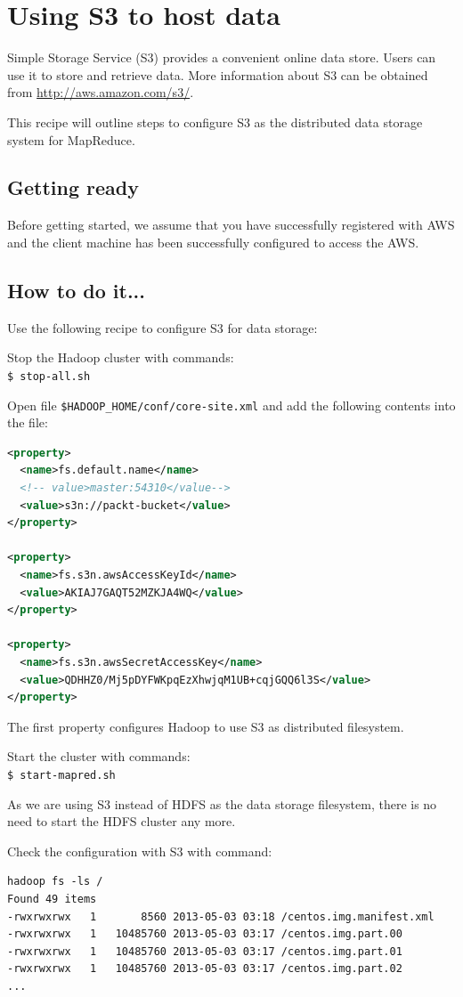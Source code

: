 \section{Using S3 to host data}
Simple Storage Service (S3) provides a convenient online data store. Users can use it to store and retrieve data. More information about S3 can be obtained from \url{http://aws.amazon.com/s3/}.

This recipe will outline steps to configure S3 as the distributed data storage system for MapReduce.

\subsection*{Getting ready}
Before getting started, we assume that you have successfully registered with AWS and the client machine has been successfully configured to access the AWS.

\subsection*{How to do it...}
Use the following recipe to configure S3 for data storage:

Stop the Hadoop cluster with commands: \\
\verb|$ stop-all.sh|

Open file \verb|$HADOOP_HOME/conf/core-site.xml| and add the following contents into the file:
\lstset{style=bashstyle}
\begin{lstlisting}[language=XML]
<property>
  <name>fs.default.name</name>
  <!-- value>master:54310</value-->
  <value>s3n://packt-bucket</value>
</property>

<property>
  <name>fs.s3n.awsAccessKeyId</name>
  <value>AKIAJ7GAQT52MZKJA4WQ</value>
</property>

<property>
  <name>fs.s3n.awsSecretAccessKey</name>
  <value>QDHHZ0/Mj5pDYFWKpqEzXhwjqM1UB+cqjGQQ6l3S</value>
</property>
\end{lstlisting}

The first property configures Hadoop to use S3 as distributed filesystem.

Start the cluster with commands: \\
\verb|$ start-mapred.sh|

As we are using S3 instead of HDFS as the data storage filesystem, there is no need to start the HDFS cluster any more.

Check the configuration with S3 with command:
\lstset{style=bashstyle}
\begin{lstlisting}
hadoop fs -ls /
Found 49 items
-rwxrwxrwx   1       8560 2013-05-03 03:18 /centos.img.manifest.xml
-rwxrwxrwx   1   10485760 2013-05-03 03:17 /centos.img.part.00
-rwxrwxrwx   1   10485760 2013-05-03 03:17 /centos.img.part.01
-rwxrwxrwx   1   10485760 2013-05-03 03:17 /centos.img.part.02
...
\end{lstlisting}

